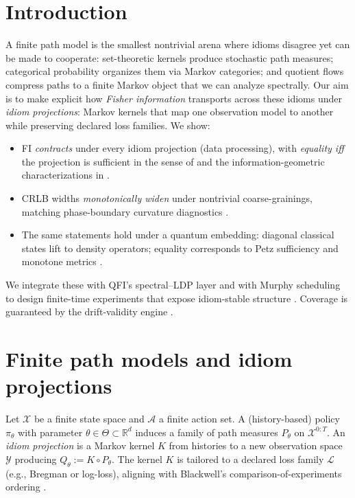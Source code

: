 \documentclass[11pt]{article}
\theoremstyle{plain}
\theoremstyle{definition}
\theoremstyle{remark}
\newcommand{\1}{\mathbbm{1}}
\begin{document}
\section{Introduction}
A finite path model is the smallest nontrivial arena where idioms disagree yet can be made to cooperate: set-theoretic kernels produce stochastic path measures; categorical probability organizes them via Markov categories; and quotient flows compress paths to a finite Markov object that we can analyze spectrally. Our aim is to make explicit how \emph{Fisher information} transports across these idioms under \emph{idiom projections}: Markov kernels that map one observation model to another while preserving declared loss families. We show:
\begin{itemize}
  \item FI \emph{contracts} under every idiom projection (data processing), with \emph{equality iff} the projection is sufficient in the sense of \textcite{Blackwell1953} and the information-geometric characterizations in \textcite{AmariNagaoka2000,Cencov1982}.
  \item CRLB widths \emph{monotonically widen} under nontrivial coarse-grainings, matching phase-boundary curvature diagnostics \parencite[Ch.\ 2, 10]{CoverThomas2006}.
  \item The same statements hold under a quantum embedding: diagonal classical states lift to density operators; equality corresponds to Petz sufficiency and monotone metrics \parencite{Petz1986,Petz1996}.
\end{itemize}
We integrate these with QFI’s spectral--LDP layer and with Murphy scheduling to design finite-time experiments that expose idiom-stable structure \parencite{elliott2025qfi,DemboZeitouni1998,elliott2025pmb}. Coverage is guaranteed by the drift-validity engine \parencite{elliott2025drift}.

\section{Finite path models and idiom projections}
Let \(\mathcal{X}\) be a finite state space and \(\mathcal{A}\) a finite action set. A (history-based) policy \(\pi_\theta\) with parameter \(\theta\in\Theta\subset\mathbb{R}^d\) induces a family of path measures \(P_\theta\) on \(\mathcal{X}^{0:T}\). An \emph{idiom projection} is a Markov kernel \(K\) from histories to a new observation space \(\mathcal{Y}\) producing \(Q_\theta:=K\circ P_\theta\). The kernel \(K\) is tailored to a declared loss family \(\mathcal{L}\) (e.g., Bregman or log-loss), aligning with Blackwell’s comparison-of-experiments ordering \parencite{Blackwell1953}.
\end{document}
